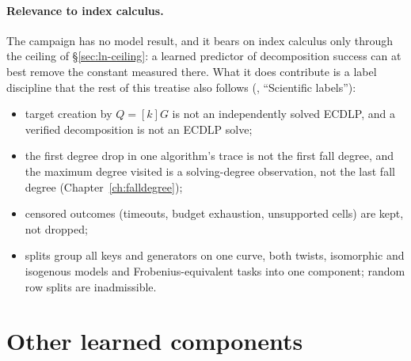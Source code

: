 \paragraph{Relevance to index calculus.} The campaign has no model result,
and it bears on index calculus only through the ceiling of
\S\ref{sec:ln-ceiling}: a learned predictor of decomposition success can at
best remove the constant measured there. What it does contribute is a label
discipline that the rest of this treatise also follows
(, ``Scientific labels''):
\begin{itemize}
\item target creation by $Q=[k]G$ is not an independently solved ECDLP, and a
  verified decomposition is not an ECDLP solve;
\item the first degree drop in one algorithm's trace is not the first fall
  degree, and the maximum degree visited is a solving-degree observation, not
  the last fall degree (Chapter~\ref{ch:falldegree});
\item censored outcomes (timeouts, budget exhaustion, unsupported cells) are
  kept, not dropped;
\item splits group all keys and generators on one curve, both twists,
  isomorphic and isogenous models and Frobenius-equivalent tasks into one
  component; random row splits are inadmissible.
\end{itemize}

\section{Other learned components}\label{sec:ln-components}

